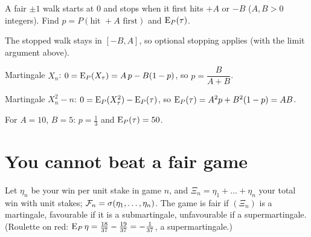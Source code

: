 \begin{pic}
\end{pic}

\begin{example}
\label{ex:ruin-ost}
A fair $\pm1$ walk starts at $0$ and stops when it first hits $+A$ or $-B$ ($A,B>0$ integers). Find $p=P(\text{hit }+A\text{ first})$ and $\operatorname{E}_P(\tau)$.
\begin{steps}
  \item The stopped walk stays in $[-B,A]$, so optional stopping applies (with the limit argument above).
  \item Martingale $X_n$: $0=\operatorname{E}_P(X_\tau)=A\,p-B(1-p)$, so $p=\dfrac{B}{A+B}$.
  \item Martingale $X_n^2-n$: $0=\operatorname{E}_P(X_\tau^2)-\operatorname{E}_P(\tau)$, so $\operatorname{E}_P(\tau)=A^2p+B^2(1-p)=AB$.
\end{steps}
For $A=10$, $B=5$: $p=\frac13$ and $\operatorname{E}_P(\tau)=50$.
\end{example}

\section{You cannot beat a fair game}

Let $\eta_n$ be your win per unit stake in game $n$, and $\Xi_n=\eta_1+\dots+\eta_n$ your total win with unit stakes; $\mathcal F_n=\sigma(\eta_1,\dots,\eta_n)$. The game is fair if $(\Xi_n)$ is a martingale, favourable if it is a submartingale, unfavourable if a supermartingale. (Roulette on red: $\operatorname{E}_P\eta=\frac{18}{37}-\frac{19}{37}=-\frac{1}{37}$, a supermartingale.)


